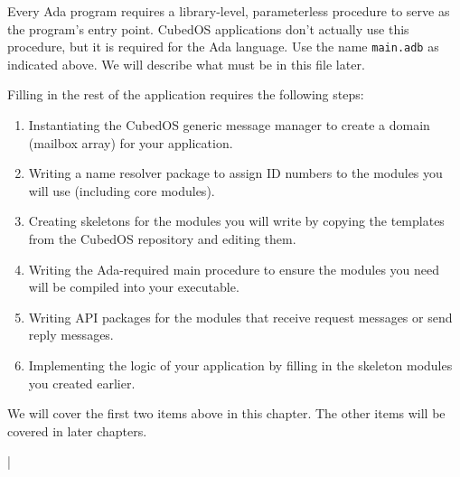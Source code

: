 \documentclass{scrreprt}
\begin{document}
Every Ada program requires a library-level, parameterless procedure to serve as the program's
entry point. CubedOS applications don't actually use this procedure, but it is required for the
Ada language. Use the name \texttt{main.adb} as indicated above. We will describe what must be
in this file later.

Filling in the rest of the application requires the following steps:
\begin{enumerate}
\item Instantiating the CubedOS generic message manager to create a domain (mailbox array) for
  your application.
\item Writing a name resolver package to assign ID numbers to the modules you will use
  (including core modules).
\item Creating skeletons for the modules you will write by copying the templates from the
  CubedOS repository and editing them.
\item Writing the Ada-required main procedure to ensure the modules you need will be compiled
  into your executable.
\item Writing API packages for the modules that receive request messages or send reply messages.
\item Implementing the logic of your application by filling in the skeleton modules you created
  earlier.
\end{enumerate}

We will cover the first two items above in this chapter. The other items will be covered in
later chapters.

\lstDeleteShortInline|




\end{document}
